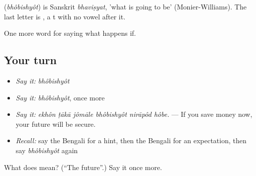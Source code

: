 \begin{cousinweb}
\textbf{} (\emph{bhôbishyôt}) is Sanskrit \emph{bhaviṣyat}, 'what is going to be' (Monier-Williams). The last letter is , a t with no vowel after it.
\end{cousinweb}

\begin{grammarlens}[title={What you've built}]
One more word for saying what happens if.
\end{grammarlens}

\subsection*{Your turn}
\begin{itemize}
\raggedright
  \item \emph{Say it:} \emph{bhôbishyôt}
  \item \emph{Say it:} \emph{bhôbishyôt}, once more
  \item \emph{Say it:} \emph{ekhôn ṭākā jômāle bhôbishyôt nirāpôd hôbe.} — If you save money now, your future will be secure.
  \item \emph{Recall:} say the Bengali for a hint, then the Bengali for an expectation, then say \emph{bhôbishyôt} again
\end{itemize}

\begin{tcolorbox}[breakable,colback=teal!4,colframe=teal!35!black,title={Before you move on}]
What does  mean? (\textquotedblleft{}The future\textquotedblright{}.) Say it once more.
\end{tcolorbox}
